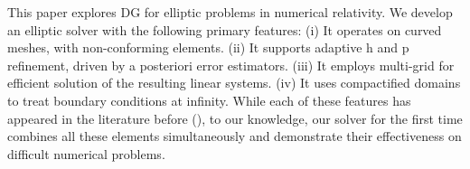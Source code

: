 %
This paper explores DG for elliptic problems in numerical relativity.
We develop  an elliptic solver with the following primary features:
(i) It operates on curved meshes, with non-conforming elements.
(ii) It supports adaptive h and p refinement, driven by a
  posteriori error estimators.
(iii) It employs multi-grid for efficient solution of the resulting
  linear systems.
(iv) It uses compactified domains to treat boundary conditions at infinity.
  While each of these features has appeared in the literature before
(\citet*{arnold.d;brezzi.f;cockburn.b;marini.l2002,stiller2017robust,hesthaven2008nodal,kronbichler2018performance,fick2014interior,kozdon2018energy,kozdon2019robust}), to our knowledge, our solver for the first
time combines all these elements simultaneously and demonstrate their
effectiveness on difficult numerical problems.

